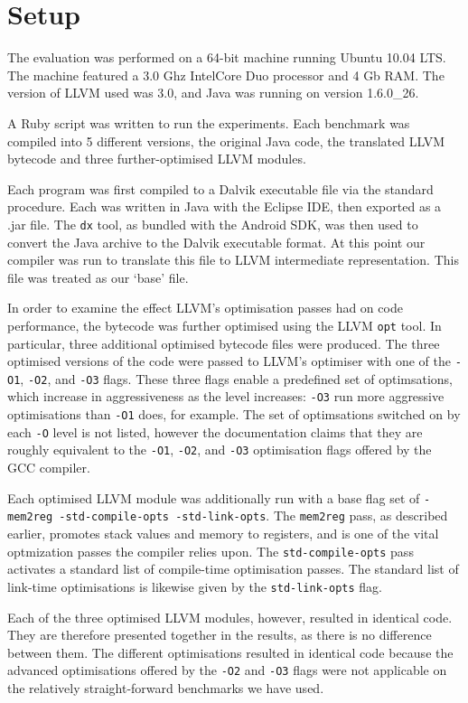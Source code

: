 \section{Setup}
\label{sec:setup}

The evaluation was performed on a 64-bit machine running Ubuntu 10.04 LTS. The machine featured a 3.0 Ghz Intel\textregistered Core Duo processor and 4 Gb RAM. The version of LLVM used was 3.0, and Java was running on version 1.6.0\_26.

A Ruby script was written to run the experiments. Each benchmark was compiled into 5 different versions, the original Java code, the translated LLVM bytecode and three further-optimised LLVM modules. 

Each program was first compiled to a Dalvik executable file via the standard procedure. Each was written in Java with the Eclipse IDE, then exported as a .jar file. The \verb|dx| tool, as bundled with the Android SDK, was then used to convert the Java archive to the Dalvik executable format. At this point our compiler was run to translate this file to LLVM intermediate representation. This file was treated as our `base' file. 

In order to examine the effect LLVM's optimisation passes had on code performance, the bytecode was further optimised using the LLVM \verb|opt| tool. In particular, three additional optimised bytecode files were produced. The three optimised versions of the code were passed to LLVM's optimiser with one of the \verb|-O1|, \verb|-O2|, and \verb|-O3| flags. These three flags enable a predefined set of optimsations, which increase in aggressiveness as the level increases: \verb|-O3| run more aggressive optimisations than \verb|-O1| does, for example. The set of optimsations switched on by each \verb|-O| level is not listed, however the documentation claims that they are roughly equivalent to the \verb|-O1|, \verb|-O2|, and \verb|-O3| optimisation flags offered by the GCC compiler.

Each optimised LLVM module was additionally run with a base flag set of \verb|-mem2reg -std-compile-opts -std-link-opts|. The \verb|mem2reg| pass, as described earlier, promotes stack values and memory to registers, and is one of the vital optmization passes the compiler relies upon. The \verb|std-compile-opts| pass activates a standard list of compile-time optimisation passes. The standard list of link-time optimisations is likewise given by the \verb|std-link-opts| flag.

Each of the three optimised LLVM modules, however, resulted in identical code. They are therefore presented together in the results, as there is no difference between them. The different optimisations resulted in identical code because the advanced optimisations offered by the \verb|-O2| and \verb|-O3| flags were not applicable on the relatively straight-forward benchmarks we have used.

